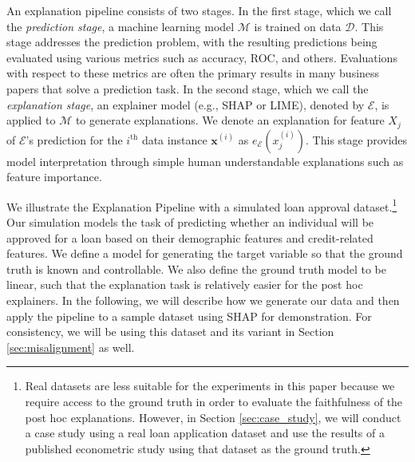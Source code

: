 \documentclass[12pt]{article}  %
\begin{document}
An explanation pipeline consists of two stages. In the first stage, which we call the \emph{prediction stage}, a machine learning model $\mathcal{M}$ is trained on data $\mathcal{D}$. This stage addresses the prediction problem, with the resulting predictions being evaluated using various metrics such as accuracy, ROC, and others. Evaluations with respect to these metrics are often the primary results in many business papers that solve a prediction task. In the second stage, which we call the \emph{explanation stage}, an explainer model (e.g., SHAP or LIME), denoted by $\mathcal{E}$, is applied to $\mathcal{M}$ to generate explanations. We denote an explanation for feature $X_j$ of $\mathcal{E}$'s prediction for the $i^{\text{th}}$ data instance $\mathbf{x}^{(i)}$ as $e_{\mathcal{E}}(x^{(i)}_j)$. This stage provides model interpretation through simple human understandable explanations such as feature importance. %
    
    We illustrate the Explanation Pipeline with a simulated loan approval dataset.\footnote{Real datasets are less suitable for the experiments in this paper because we require access to the ground truth in order to evaluate the faithfulness of the post hoc explanations. However, in Section \ref{sec:case_study}, we will conduct a case study using a real loan application dataset and use the results of a published econometric study using that dataset as the ground truth.} Our simulation models the task of predicting whether an individual will be approved for a loan based on their demographic features and credit-related features. We define a model for generating the target variable so that the ground truth is known and controllable. We also define the ground truth model to be linear, such that the explanation task is relatively easier for the post hoc explainers. %
    In the following, we will describe how we generate our data and then apply the pipeline to a sample dataset using SHAP for demonstration. For consistency, we will be using this dataset and its variant in Section \ref{sec:misalignment} as well. %
\end{document}
